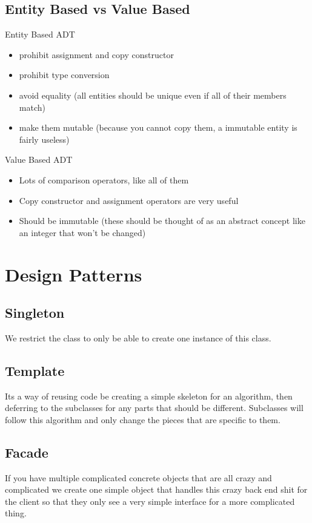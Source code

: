 \documentclass[12pt]{article}
\begin{document}
\subsection*{Entity Based vs Value Based}
Entity Based ADT
\begin{itemize}
  \item prohibit assignment and copy constructor
  \item prohibit type conversion
  \item avoid equality (all entities should be unique even if all of their members match)
  \item make them mutable (because you cannot copy them, a immutable entity is fairly useless)
\end{itemize}
Value Based ADT
\begin{itemize}
  \item Lots of comparison operators, like all of them
  \item Copy constructor and assignment operators are very useful
  \item Should be immutable (these should be thought of as an abstract concept like an integer that won't be changed)
\end{itemize}

\section*{Design Patterns}

\subsection*{Singleton}
We restrict the class to only be able to create one instance of this class.

\subsection*{Template}
Its a way of reusing code be creating a simple skeleton for an algorithm, then deferring to the subclasses for any parts that should be different. Subclasses will follow this algorithm and only change the pieces that are specific to them.

\subsection*{Facade}
If you have multiple complicated concrete objects that are all crazy and complicated we create one simple object that handles this crazy back end shit for the client so that they only see a very simple interface for a more complicated thing.
\end{document}
